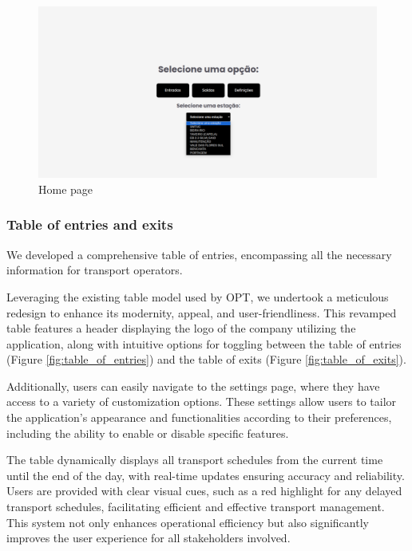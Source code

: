 \documentclass[10pt]{article}
\begin{document}
        \vfill
        \begin{figure}[htbp]
            \centering
            \includegraphics[width=1\textwidth]{home_page}
            \caption{Home page}
            \label{fig:home_page}
        \end{figure}

        \subsubsection{Table of entries and exits}

        We developed a comprehensive table of entries, encompassing all the necessary information for transport operators. 
        
        Leveraging the existing table model used by OPT, we undertook a meticulous redesign to enhance its modernity, appeal, and user-friendliness. This revamped table features a header displaying the logo of the company utilizing the application, along with intuitive options for toggling between the table of entries (Figure \ref{fig:table_of_entries}) and the table of exits (Figure \ref{fig:table_of_exits}).
        
        Additionally, users can easily navigate to the settings page, where they have access to a variety of customization options. These settings allow users to tailor the application's appearance and functionalities according to their preferences, including the ability to enable or disable specific features.
        
        The table dynamically displays all transport schedules from the current time until the end of the day, with real-time updates ensuring accuracy and reliability. Users are provided with clear visual cues, such as a red highlight for any delayed transport schedules, facilitating efficient and effective transport management. This system not only enhances operational efficiency but also significantly improves the user experience for all stakeholders involved.
       
\end{document}
